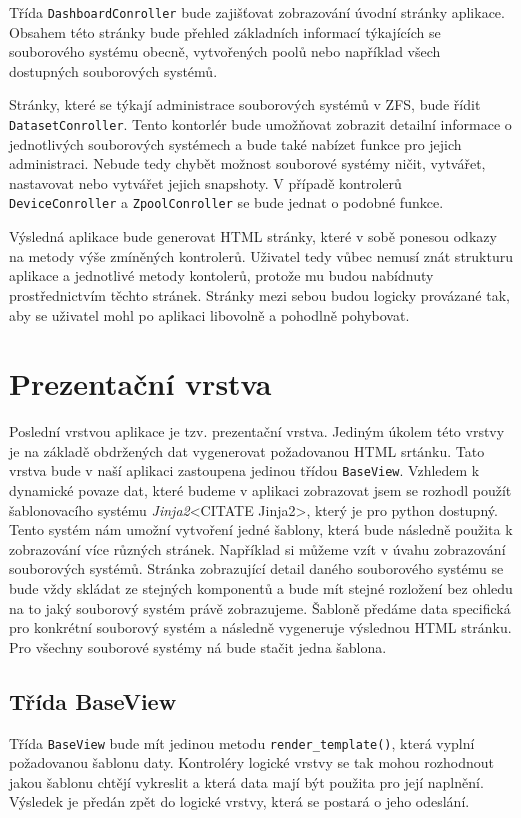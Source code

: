     Třída \verb|DashboardConroller| bude zajišťovat zobrazování úvodní stránky aplikace. Obsahem této stránky bude přehled základních informací týkajících se souborového systému obecně, vytvořených poolů nebo například všech dostupných souborových systémů.

    Stránky, které se týkají administrace souborových systémů v ZFS, bude řídit \verb|DatasetConroller|. Tento kontorlér bude umožňovat zobrazit detailní informace o jednotlivých souborových systémech a bude také nabízet funkce pro jejich administraci. Nebude tedy chybět možnost souborové systémy ničit, vytvářet, nastavovat nebo vytvářet jejich snapshoty.
    V případě kontrolerů \verb|DeviceConroller| a \verb|ZpoolConroller| se bude jednat o podobné funkce.

    Výsledná aplikace bude generovat HTML stránky, které v sobě ponesou odkazy na metody výše zmíněných kontrolerů. Uživatel tedy vůbec nemusí znát strukturu aplikace a jednotlivé metody kontolerů, protože mu budou nabídnuty prostřednictvím těchto stránek. Stránky mezi sebou budou logicky provázané tak, aby se uživatel mohl po aplikaci libovolně a pohodlně pohybovat.

\section{Prezentační vrstva}
Poslední vrstvou aplikace je tzv. prezentační vrstva. Jediným úkolem této vrstvy je na základě obdržených dat vygenerovat požadovanou HTML srtánku. Tato vrstva bude v naší aplikaci zastoupena jedinou třídou \verb|BaseView|. Vzhledem k dynamické povaze dat, které budeme v aplikaci zobrazovat jsem se rozhodl použít šablonovacího systému \emph{Jinja2}<CITATE Jinja2>, který je pro python dostupný. Tento systém nám umožní vytvoření jedné šablony, která bude následně použita k zobrazování více různých stránek. Například si můžeme vzít v úvahu zobrazování souborových systémů. Stránka zobrazující detail daného souborového systému se bude vždy skládat ze stejných komponentů a bude mít stejné rozložení bez ohledu na to jaký souborový systém právě zobrazujeme. Šabloně předáme data specifická pro konkrétní souborový systém a následně vygeneruje výslednou HTML stránku. Pro všechny souborové systémy ná bude stačit jedna šablona.
    \subsection{Třída BaseView}
    Třída \verb|BaseView| bude mít jedinou metodu \verb|render_template()|, která vyplní požadovanou šablonu daty. Kontroléry logické vrstvy se tak mohou rozhodnout jakou šablonu chtějí vykreslit a která data mají být použita pro její naplnění. Výsledek je předán zpět do logické vrstvy, která se postará o jeho odeslání.
